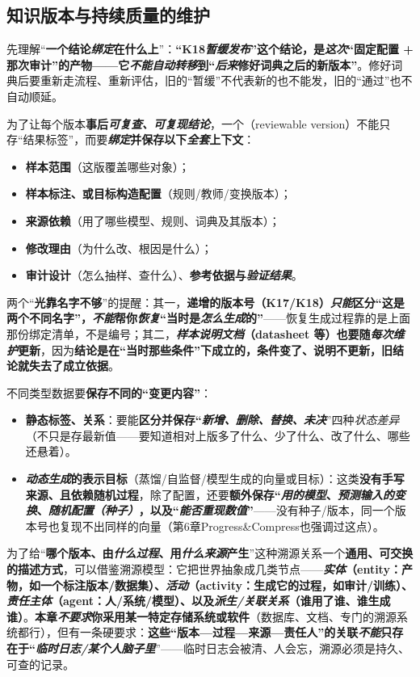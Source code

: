 \subsection{知识版本与持续质量的维护}
\label{sec:knowledge-quality-assessment-correction-version-maintenance}

先理解“\textbf{一个结论\emph{绑定}在什么上}”：\textbf{“K18\emph{暂缓发布}”这个结论，是\emph{这次}“固定配置 + 那次审计”的产物——它\textbf{\emph{不能自动转移}到“\emph{后来}修好词典之后的新版本}”}。修好词典后要重新走流程、重新评估，旧的“暂缓”不代表新的也不能发，旧的“通过”也不自动顺延。

为了让每个版本\textbf{事后\emph{可复查、可复现结论}}，一个（reviewable version）不能只存“结果标签”，而要\textbf{\emph{绑定}并保存以下\emph{全套}上下文}：
\begin{itemize}\item \textbf{样本范围}（这版覆盖哪些对象）；\item \textbf{样本标注、或目标构造配置}（规则/教师/变换版本）；\item \textbf{来源依赖}（用了哪些模型、规则、词典及其版本）；\item \textbf{修改理由}（为什么改、根因是什么）；\item \textbf{审计设计}（怎么抽样、查什么）、\textbf{参考依据与\emph{验证结果}}。\end{itemize}
两个“\textbf{光靠名字不够}”的提醒：其一，\textbf{递增的版本号（K17/K18）\emph{只能}区分“这是两个不同名字”，\emph{不能}帮你\emph{恢复}“当时是\emph{怎么生成}的”}——恢复生成过程靠的是上面那份绑定清单，不是编号；其二，\textbf{\emph{样本说明文档}（datasheet 等）也要随\emph{每次维护}更新}，因为\textbf{结论是在“当时那些条件”下成立的，条件变了、说明不更新，旧结论就失去了成立依据}。

不同类型数据要\textbf{保存不同的“变更内容”}：
\begin{itemize}\item \textbf{静态标签、关系}：要能\textbf{区分并保存“\emph{新增、删除、替换、未决}}”四种\emph{状态差异}（不只是存最新值——要知道相对上版多了什么、少了什么、改了什么、哪些还悬着）。\item \textbf{\emph{动态生成}的表示目标}（蒸馏/自监督/模型生成的向量或目标）：这类\textbf{没有手写来源、且依赖随机过程}，除了配置，还要\textbf{额外保存“\emph{用的模型}、\emph{预测输入的变换}、\emph{随机配置（种子）}，以及“\emph{能否\emph{重现}数值}”}——没有种子/版本，同一个版本号也复现不出同样的向量（第6章Progress\&Compress也强调过这点）。\end{itemize}为了给“\textbf{哪个版本、由\emph{什么过程}、用\emph{什么来源}产生}”这种溯源关系一个\textbf{通用、可交换的描述方式}，可以借鉴溯源模型：它把世界抽象成几类节点——\textbf{\emph{实体}（entity：产物，如一个标注版本/数据集）、\emph{活动}（activity：生成它的过程，如审计/训练）、\emph{责任主体}（agent：人/系统/模型）、以及\emph{派生/关联关系}（谁用了谁、谁生成谁）}。\textbf{本章\emph{不要求}你采用某一特定存储系统或软件}（数据库、文档、专门的溯源系统都行），但有一条硬要求：\textbf{这些“版本—过程—来源—责任人”的关联\emph{不能}只存在于“\emph{临时日志/某个人脑子里}}”——临时日志会被清、人会忘，溯源必须是持久、可查的记录。

